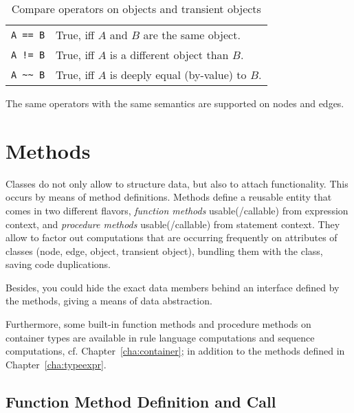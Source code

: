 \begin{table}[htbp]
  \centering
  \begin{tabularx}{\linewidth}{|l|X|}
    \hline
    \texttt{A == B} & True, iff $A$ and $B$ are the same object. \\
    \texttt{A != B} & True, iff $A$ is a different object than $B$. \\
    \texttt{A \textasciitilde\textasciitilde\ B} & True, iff $A$ is deeply equal (by-value) to $B$. \\
    \hline
  \end{tabularx}
  \caption{Compare operators on objects and transient objects}
  \label{compandarithmetic}
\end{table}

The same operators with the same semantics are supported on nodes and edges.


\section{Methods}\label{sec:objectoriented}

Classes do not only allow to structure data, but also to attach functionality.
This occurs by means of method definitions.
Methods define a reusable entity that comes in two different flavors, \emph{function methods} usable(/callable) from expression context, and \emph{procedure methods} usable(/callable) from statement context.
They allow to factor out computations that are occurring frequently on attributes of classes (node, edge, object, transient object), bundling them with the class, saving code duplications. 

Besides, you could hide the exact data members behind an interface defined by the methods, giving a means of data abstraction.

Furthermore, some built-in function methods and procedure methods on container types are available in rule language computations and sequence computations, cf. Chapter~\ref{cha:container};
in addition to the methods defined in Chapter~\ref{cha:typeexpr}.

\subsection{Function Method Definition and Call}\label{sub:functionmethods}\label{sub:funcmethcall} 

